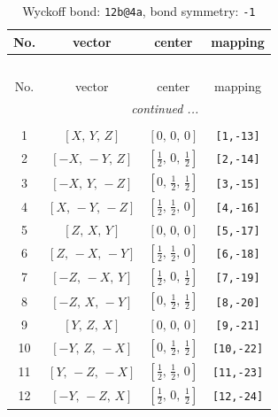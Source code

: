 \documentclass[fleqn,8pt]{jsarticle}
\begin{document}
\begin{longtable}{cccc}
\caption{Wyckoff bond: {\tt 12b@4a}, bond symmetry: {\tt -1}}
 \\
 \hline \hline
No. & vector & center & mapping \\ \hline \endfirsthead

\multicolumn{3}{l}{\tablename\ \thetable{}} \\
 \hline \hline
No. & vector & center & mapping \\ \hline \endhead

 \hline \hline
\multicolumn{3}{r}{\footnotesize\it continued ...} \\ \endfoot

 \hline \hline
\multicolumn{3}{r}{} \\ \endlastfoot

1 & $\left[ X,\, Y,\, Z \right]$ & $\left[ 0,\, 0,\, 0 \right]$ & {\tt [1,-13]} \\ \hline
2 & $\left[ - X,\, - Y,\, Z \right]$ & $\left[ \frac{1}{2},\, 0,\, \frac{1}{2} \right]$ & {\tt [2,-14]} \\ \hline
3 & $\left[ - X,\, Y,\, - Z \right]$ & $\left[ 0,\, \frac{1}{2},\, \frac{1}{2} \right]$ & {\tt [3,-15]} \\ \hline
4 & $\left[ X,\, - Y,\, - Z \right]$ & $\left[ \frac{1}{2},\, \frac{1}{2},\, 0 \right]$ & {\tt [4,-16]} \\ \hline
5 & $\left[ Z,\, X,\, Y \right]$ & $\left[ 0,\, 0,\, 0 \right]$ & {\tt [5,-17]} \\ \hline
6 & $\left[ Z,\, - X,\, - Y \right]$ & $\left[ \frac{1}{2},\, \frac{1}{2},\, 0 \right]$ & {\tt [6,-18]} \\ \hline
7 & $\left[ - Z,\, - X,\, Y \right]$ & $\left[ \frac{1}{2},\, 0,\, \frac{1}{2} \right]$ & {\tt [7,-19]} \\ \hline
8 & $\left[ - Z,\, X,\, - Y \right]$ & $\left[ 0,\, \frac{1}{2},\, \frac{1}{2} \right]$ & {\tt [8,-20]} \\ \hline
9 & $\left[ Y,\, Z,\, X \right]$ & $\left[ 0,\, 0,\, 0 \right]$ & {\tt [9,-21]} \\ \hline
10 & $\left[ - Y,\, Z,\, - X \right]$ & $\left[ 0,\, \frac{1}{2},\, \frac{1}{2} \right]$ & {\tt [10,-22]} \\ \hline
11 & $\left[ Y,\, - Z,\, - X \right]$ & $\left[ \frac{1}{2},\, \frac{1}{2},\, 0 \right]$ & {\tt [11,-23]} \\ \hline
12 & $\left[ - Y,\, - Z,\, X \right]$ & $\left[ \frac{1}{2},\, 0,\, \frac{1}{2} \right]$ & {\tt [12,-24]} \\
\end{longtable}
\end{document}
